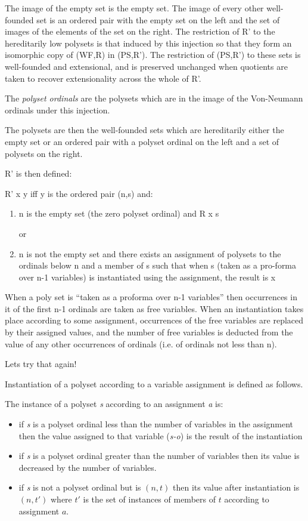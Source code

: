 \documentclass[numreferences]{rbjk}
\begin{document}
\begin{article}
The image of the empty set is the empty set.
The image of every other well-founded set is an ordered pair with the empty set on the left and the set of images of the elements of the set on the right.
The restriction of \textsf{R'} to the hereditarily low polysets is that induced by this injection so that they form an isomorphic copy of \textsf{(WF,R)} in \textsf{(PS,R')}.
The restriction of \textsf{(PS,R')} to these sets is well-founded and extensional, and is preserved unchanged when quotients are taken to recover extensionality across the whole of \textsf{R'}.

The \emph{polyset ordinals} are the polysets which are in the image of the Von-Neumann ordinals under this injection.

The polysets are then the well-founded sets which are hereditarily either the empty set or an ordered pair with a polyset ordinal on the left and a set of polysets on the right.

\textsf{R'} is then defined:

\textsf{R' x y} iff y is the ordered pair \textsf{(n,s)} and:

\begin{enumerate}
\item n is the empty set (the zero polyset ordinal) and \textsf{R x s} 

or
\item n is not the empty set and there exists an assignment of polysets to the ordinals below n and a member of s such that when s (taken as a pro-forma over n-1 variables) is instantiated using the assignment, the result is x 
\end{enumerate}

When a poly set is ``taken as a proforma over n-1 variables'' then occurrences in it of the first n-1 ordinals are taken as free variables.
When an instantiation takes place according to some assignment, occurrences of the free variables are replaced by their assigned values, and the number of free variables is deducted from the value of any other occurrences of ordinals (i.e. of ordinals not less than n).

Lets try that again!

Instantiation of a polyset according to a variable assignment is defined as follows.

The instance of a polyset \emph{s} according to an assignment \emph{a} is:
\begin{itemize}
\item if \emph{s} is a polyset ordinal less than the number of variables in the assignment then the value assigned to that variable (\emph{s-o}) is the result of the instantiation
\item if \emph{s} is a polyset ordinal greater than the number of variables then its value is decreased by the number of variables.
\item if \emph{s} is not a polyset ordinal but is $(n,t)$ then its value after instantiation is $(n,t')$ where $t'$ is the set of instances of members of $t$ according to assignment $a$.
\end{itemize}


\end{article}
\end{document}
